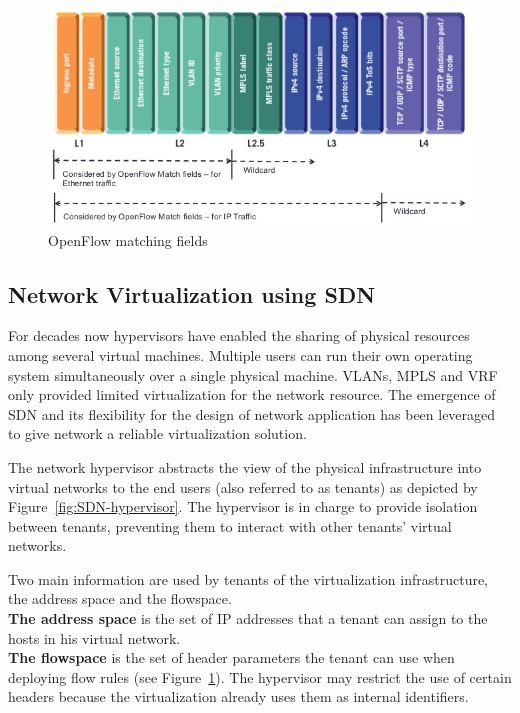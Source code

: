 \begin{figure}[h]
    \centering
    \includegraphics[scale=0.7]{figures/openflow-matchfields.png}
    \caption{OpenFlow matching fields~\cite{openflow-matchfields}}
    \label{fig:matching-fields}
\end{figure}

\subsection{Network Virtualization using SDN}
For decades now hypervisors have enabled the sharing of physical resources among several virtual machines.
Multiple users can run their own operating system simultaneously over a single physical machine.
VLANs, MPLS and VRF only provided limited virtualization for the network resource. The emergence of SDN and its flexibility for the design of network application has been leveraged to give network a reliable virtualization solution.

 

The network hypervisor abstracts the view of the physical infrastructure into virtual networks to the end users (also referred to as tenants) as depicted by Figure~\ref{fig:SDN-hypervisor}.
The hypervisor is in charge to provide isolation between tenants, preventing them to interact with other tenants' virtual networks.

Two main information are used by tenants of the virtualization infrastructure, the address space and the flowspace.\\
\textbf{The address space} is the set of IP addresses that a tenant can assign to the hosts in his virtual network.\\
\textbf{The flowspace} is the set of header parameters the tenant can use when deploying flow rules (see Figure~\ref{fig:matching-fields}). The hypervisor may restrict the use of certain headers because the virtualization already uses them as internal identifiers.



